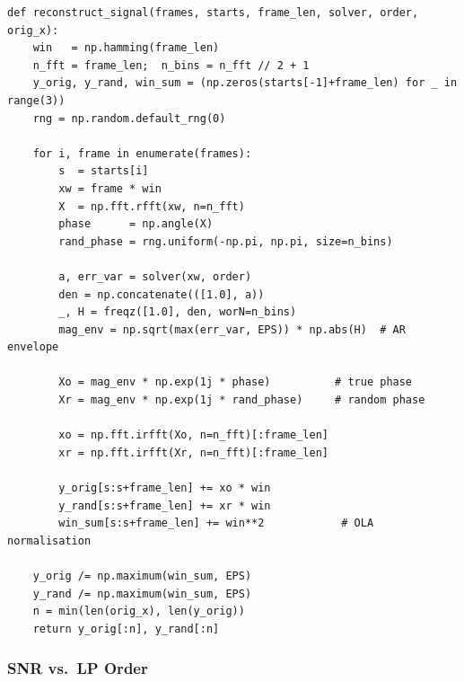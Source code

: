 \documentclass[12pt,a4paper,onecolumn]{exam}
\begin{document}
\begin{lstlisting}[caption={Signal reconstruction via overlap-add with original and random phase}]
def reconstruct_signal(frames, starts, frame_len, solver, order, orig_x):
    win   = np.hamming(frame_len)
    n_fft = frame_len;  n_bins = n_fft // 2 + 1
    y_orig, y_rand, win_sum = (np.zeros(starts[-1]+frame_len) for _ in range(3))
    rng = np.random.default_rng(0)

    for i, frame in enumerate(frames):
        s  = starts[i]
        xw = frame * win
        X  = np.fft.rfft(xw, n=n_fft)
        phase      = np.angle(X)
        rand_phase = rng.uniform(-np.pi, np.pi, size=n_bins)

        a, err_var = solver(xw, order)
        den = np.concatenate(([1.0], a))
        _, H = freqz([1.0], den, worN=n_bins)
        mag_env = np.sqrt(max(err_var, EPS)) * np.abs(H)  # AR envelope

        Xo = mag_env * np.exp(1j * phase)          # true phase
        Xr = mag_env * np.exp(1j * rand_phase)     # random phase

        xo = np.fft.irfft(Xo, n=n_fft)[:frame_len]
        xr = np.fft.irfft(Xr, n=n_fft)[:frame_len]

        y_orig[s:s+frame_len] += xo * win
        y_rand[s:s+frame_len] += xr * win
        win_sum[s:s+frame_len] += win**2            # OLA normalisation

    y_orig /= np.maximum(win_sum, EPS)
    y_rand /= np.maximum(win_sum, EPS)
    n = min(len(orig_x), len(y_orig))
    return y_orig[:n], y_rand[:n]
\end{lstlisting}

\subsubsection*{SNR vs.\ LP Order}
\end{document}
